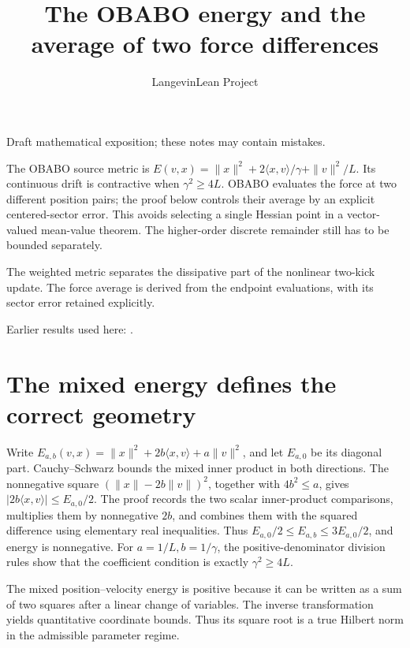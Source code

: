 \documentclass[11pt,a4paper]{article}
\title{\texorpdfstring{The OBABO energy and the average of two force differences}{The OBABO energy and the average of two force differences}}
\author{LangevinLean Project}
\date{}
\begin{document}
\maketitle
Draft mathematical exposition; these notes may contain mistakes.


The OBABO source metric is \(E(v,x)=\|x\|^2+2\langle x,v\rangle/\gamma+\|v\|^2/L\). Its continuous drift is contractive when \(\gamma^2\ge4L\). OBABO evaluates the force at two different position pairs; the proof below controls their average by an explicit centered-sector error. This avoids selecting a single Hessian point in a vector-valued mean-value theorem. The higher-order discrete remainder still has to be bounded separately.



The weighted metric separates the dissipative part of the nonlinear two-kick update. The force average is derived from the endpoint evaluations, with its sector error retained explicitly.



Earlier results used here: \cite[Section~3.10]{LangevinLean2026ULASC}.

\section{\texorpdfstring{The mixed energy defines the correct geometry}{The mixed energy defines the correct geometry}}


Write \(E_{a,b}(v,x)=\|x\|^2+2b\langle x,v\rangle+a\|v\|^2\), and let \(E_{a,0}\) be its diagonal part. Cauchy–Schwarz bounds the mixed inner product in both directions. The nonnegative square \((\|x\|-2b\|v\|)^2\), together with \(4b^2\le a\), gives \(|2b\langle x,v\rangle|\le E_{a,0}/2\). The proof records the two scalar inner-product comparisons, multiplies them by nonnegative \(2b\), and combines them with the squared difference using elementary real inequalities. Thus \(E_{a,0}/2\le E_{a,b}\le3E_{a,0}/2\), and energy is nonnegative. For \(a=1/L,b=1/\gamma\), the positive-denominator division rules show that the coefficient condition is exactly \(\gamma^2\ge4L\).



The mixed position–velocity energy is positive because it can be written as a sum of two squares after a linear change of variables. The inverse transformation yields quantitative coordinate bounds. Thus its square root is a true Hilbert norm in the admissible parameter regime.
\end{document}
